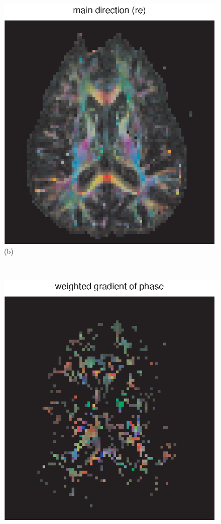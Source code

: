 \documentclass[authoryear,preprint,12pt]{elsarticle}
\begin{document}
\begin{figure}[p]
\begin{center}
\begin{minipage}[]{.42\textwidth}
      \includegraphics[width=\textwidth]{tensdir55.eps}
        (b)
      \end{minipage}\\
       \begin{minipage}[]{.42\textwidth}
      \centering
       \includegraphics[width=\textwidth]{gradphase55b.eps}

\end{minipage}
\end{center}
\end{figure}
\end{document}
